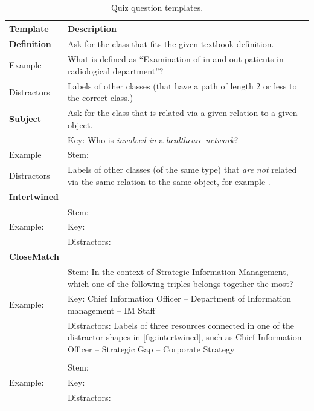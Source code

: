 \documentclass{IOS-Book-Article}     %
\begin{document}
\begin{table}[t]
\caption{Quiz question templates.}
\label{tab:templates}
\centering
\begin{tabulary}{\columnwidth}{lL}
\toprule
\textbf{Template}	&\textbf{Description}\\
\midrule
\textbf{Definition}		&Ask for the class that fits the given textbook definition.\\
Example					&What is defined as \enquote{Examination of in and out patients in radiological department}?\\
Distractors				&Labels of other classes (that have a path of length 2 or less to the correct class.)\\
\midrule
\textbf{Subject}		&Ask for the class that is related via a given relation to a given object.\\
						&Key: Who is \emph{involved in} a \emph{healthcare network}?\\
Example					&Stem: \\
Distractors				&Labels of other classes (of the same type) that \emph{are not} related via the same relation to the same object, for example .\\
\midrule
\textbf{Intertwined}	&\\
						&Stem: \\
Example:				&Key: \\
						&Distractors: \\
\midrule
\textbf{CloseMatch}		&\\
						&Stem: In the context of Strategic Information Management, which one of the following triples belongs together the most?\\
Example:				&Key: Chief Information Officer – Department of Information management – IM Staff \\
						&Distractors: Labels of three resources connected in one of the distractor shapes in \cref{fig:intertwined}, such as
						Chief Information Officer – Strategic Gap – Corporate Strategy\\
\midrule
\textbf{}				&\\
						&Stem: \\
Example:				&Key: \\
						&Distractors: \\
\bottomrule
\end{tabulary}
\end{table}
\end{document}
